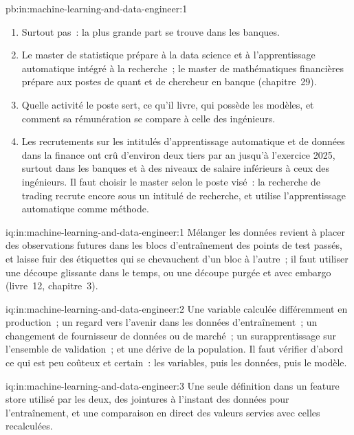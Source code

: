 \begin{solution}{pb:in:machine-learning-and-data-engineer:1}
\begin{enumerate}
\item Surtout pas~: la plus grande part se trouve dans les banques.
\item Le master de statistique prépare à la data science et à l'apprentissage automatique intégré à la recherche~; le
master de mathématiques financières prépare aux postes de quant et de chercheur en banque (chapitre~29).
\item Quelle activité le poste sert, ce qu'il livre, qui possède les modèles, et comment sa rémunération se compare à celle des ingénieurs.
\item Les recrutements sur les intitulés d'apprentissage automatique et de données dans la finance ont crû d'environ deux tiers par an jusqu'à l'exercice 2025, surtout dans les banques
et à des niveaux de salaire inférieurs à ceux des ingénieurs. Il faut choisir le master selon le poste visé~: la recherche de trading recrute encore sous un intitulé de recherche,
et utilise l'apprentissage automatique comme méthode.
\end{enumerate}
\end{solution}

\begin{solution}{iq:in:machine-learning-and-data-engineer:1}
Mélanger les données revient à placer des observations futures dans les blocs d'entraînement des points de test passés, et laisse fuir des étiquettes qui se chevauchent
d'un bloc à l'autre~; il faut utiliser une découpe glissante dans le temps, ou une découpe purgée et avec embargo (livre~12, chapitre~3).
\end{solution}

\begin{solution}{iq:in:machine-learning-and-data-engineer:2}
Une variable calculée différemment en production~; un regard vers l'avenir dans les données d'entraînement~; un changement de fournisseur de données ou de marché~;
un surapprentissage sur l'ensemble de validation~; et une dérive de la population. Il faut vérifier d'abord ce qui est peu coûteux et certain~: les variables, puis les données, puis
le modèle.
\end{solution}

\begin{solution}{iq:in:machine-learning-and-data-engineer:3}
Une seule définition dans un feature store utilisé par les deux, des jointures à l'instant des données pour l'entraînement, et une comparaison en direct des valeurs servies
avec celles recalculées.
\end{solution}

